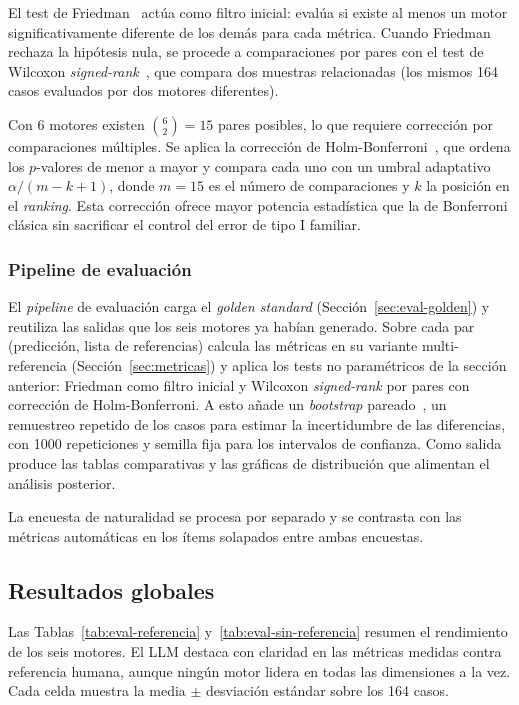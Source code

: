 El test de Friedman~\cite{friedman1937use} actúa como filtro inicial: evalúa si existe al menos un motor significativamente diferente de los demás para cada métrica. Cuando Friedman rechaza la hipótesis nula, se procede a comparaciones por pares con el test de Wilcoxon \textit{signed-rank}~\cite{wilcoxon1945individual}, que compara dos muestras relacionadas (los mismos 164 casos evaluados por dos motores diferentes).

Con 6 motores existen $\binom{6}{2} = 15$ pares posibles, lo que requiere corrección por comparaciones múltiples. Se aplica la corrección de Holm-Bonferroni~\cite{holm1979simple}, que ordena los $p$-valores de menor a mayor y compara cada uno con un umbral adaptativo $\alpha / (m - k + 1)$, donde $m = 15$ es el número de comparaciones y $k$ la posición en el \textit{ranking}. Esta corrección ofrece mayor potencia estadística que la de Bonferroni clásica sin sacrificar el control del error de tipo I familiar.

\subsubsection{Pipeline de evaluación}
\label{sec:eval-pipeline}

El \textit{pipeline} de evaluación carga el \textit{golden standard} (Sección~\ref{sec:eval-golden}) y reutiliza las salidas que los seis motores ya habían generado. Sobre cada par (predicción, lista de referencias) calcula las métricas en su variante multi-referencia (Sección~\ref{sec:metricas}) y aplica los tests no paramétricos de la sección anterior: Friedman como filtro inicial y Wilcoxon \textit{signed-rank} por pares con corrección de Holm-Bonferroni. A esto añade un \textit{bootstrap} pareado~\cite{koehn2004statistical}, un remuestreo repetido de los casos para estimar la incertidumbre de las diferencias, con 1000 repeticiones y semilla fija para los intervalos de confianza. Como salida produce las tablas comparativas y las gráficas de distribución que alimentan el análisis posterior.

La encuesta de naturalidad se procesa por separado y se contrasta con las métricas automáticas en los ítems solapados entre ambas encuestas.

\subsection{Resultados globales}
\label{sec:eval-resultados-globales}

Las Tablas~\ref{tab:eval-referencia} y~\ref{tab:eval-sin-referencia} resumen el rendimiento de los seis motores. El LLM destaca con claridad en las métricas medidas contra referencia humana, aunque ningún motor lidera en todas las dimensiones a la vez. Cada celda muestra la media $\pm$ desviación estándar sobre los 164 casos.

